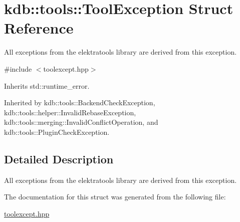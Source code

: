 \hypertarget{structkdb_1_1tools_1_1ToolException}{\section{kdb\+:\+:tools\+:\+:Tool\+Exception Struct Reference}
\label{structkdb_1_1tools_1_1ToolException}
}


All exceptions from the elektratools library are derived from this exception.  




{\ttfamily \#include $<$toolexcept.\+hpp$>$}



Inherits std\+::runtime\+\_\+error.



Inherited by kdb\+::tools\+::\+Backend\+Check\+Exception, kdb\+::tools\+::helper\+::\+Invalid\+Rebase\+Exception, kdb\+::tools\+::merging\+::\+Invalid\+Conflict\+Operation, and kdb\+::tools\+::\+Plugin\+Check\+Exception.



\subsection{Detailed Description}
All exceptions from the elektratools library are derived from this exception. 

The documentation for this struct was generated from the following file\+:\begin{DoxyCompactItemize}
\item 
\hyperlink{toolexcept_8hpp}{toolexcept.\+hpp}\end{DoxyCompactItemize}
